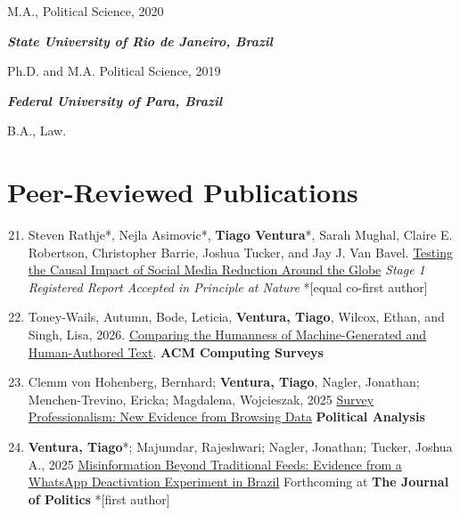 \documentclass[letterpaper, 11pt]{article}
\newenvironment{benumerate}[1]{
    \let\oldItem\item
    \def\item{\addtocounter{enumi}{-2}\oldItem}
    \begin{enumerate}[leftmargin=2em]
    \setcounter{enumi}{#1}
    \addtocounter{enumi}{1}
}{
    \end{enumerate}
}
\begin{document}
M.A.,  Political Science, 2020

\vspace{.3cm}

\textit{\textbf{State University of Rio de Janeiro, Brazil}}

Ph.D. and M.A. Political Science, 2019

\vspace{.3cm}

\textit{\textbf{Federal University of Para, Brazil}}

B.A.,  Law.

\section*{Peer-Reviewed Publications}

     \begin{benumerate}{20}

    \item Steven Rathje*, Nejla Asimovic*, \textbf{Tiago Ventura}*,  Sarah Mughal, Claire E. Robertson, Christopher Barrie, Joshua Tucker, and Jay J. Van Bavel. \href{https://osf.io/preprints/psyarxiv/ujtxa_v1}{Testing the Causal Impact of Social Media Reduction Around the Globe} \textit{Stage 1 Registered Report Accepted in Principle at Nature} *[equal co-first author]

      \item Toney-Wails, Autumn, Bode, Leticia, \textbf{Ventura, Tiago}, Wilcox, Ethan, and Singh, Lisa, 2026. \href{https://dl.acm.org/doi/10.1145/3806206}{Comparing the Humanness of Machine-Generated and Human-Authored Text}. \textbf{ACM Computing Surveys}

      \item  Clemm von Hohenberg, Bernhard; \textbf{Ventura, Tiago}, Nagler, Jonathan; Menchen-Trevino, Ericka; Magdalena, Wojcieszak, 2025 \href{https://www.cambridge.org/core/journals/political-analysis/article/survey-professionalism-new-evidence-from-web-browsing-data/552625B9C6C5F32BA1DD69435043C184}{Survey Professionalism: New Evidence from Browsing Data} \textbf{Political Analysis}

        \item \textbf{Ventura, Tiago}*; Majumdar, Rajeshwari; Nagler, Jonathan; Tucker, Joshua A., 2025 \href{https://www.journals.uchicago.edu/doi/epdf/10.1086/737172}{Misinformation Beyond Traditional Feeds: Evidence from a WhatsApp Deactivation Experiment in Brazil} Forthcoming at  \textbf{The Journal of Politics} *[first author]


\end{benumerate}
\end{document}
